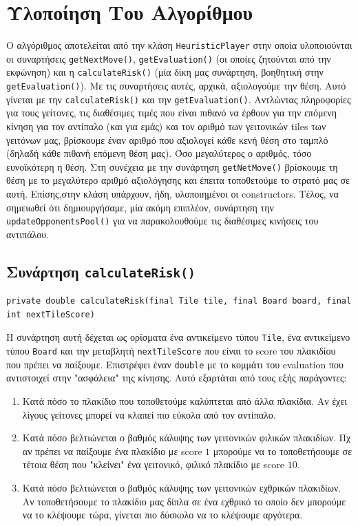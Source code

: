 \chapter{Υλοποίηση Του Αλγορίθμου}
\begin{sloppypar}
Ο αλγόριθμος αποτελείται από την κλάση \lstinline!HeuristicPlayer! στην οποία υλοποιούνται οι
συναρτήσεις  \lstinline!getNextMove()!,
\lstinline!getEvaluation()! (οι οποίες ζητούνται από την εκφώνηση) και η
\lstinline!calculateRisk()! (μία δίκη μας συνάρτηση, βοηθητική στην \lstinline!getEvaluation()!).
Με τις συναρτήσεις αυτές, αρχικά, αξιολογούμε την θέση.
Αυτό γίνεται με την \lstinline!calculateRisk()! και την
\lstinline!getEvaluation()!.
Αντλώντας πληροφορίες για τους γείτονες, τις διαθέσιμες τιμές που είναι
πιθανό να έρθουν για την επόμενη κίνηση  για τον αντίπαλο (και για εμάς) και τον αριθμό
των γειτονικών tiles των γειτόνων μας,
βρίσκουμε έναν αριθμό που αξιολογεί κάθε κενή θέση στο ταμπλό
(δηλαδή κάθε πιθανή επόμενη θέση μας).
Όσο μεγαλύτερος ο αριθμός, τόσο ευνοϊκότερη η θέση.
Στη συνέχεια με την συνάρτηση \lstinline!getNetMove()! βρίσκουμε τη
θέση με το μεγαλύτερο αριθμό αξιολόγησης και έπειτα τοποθετούμε το στρατό μας σε αυτή.
Επίσης,στην κλάση υπάρχουν, ήδη, υλοποιημένοι οι constructors.
Τέλος, να σημειωθεί ότι δημιουργήσαμε, μία ακόμη επιπλέον, συνάρτηση την \lstinline!updateOpponentsPool()! για να
παρακολουθούμε τις διαθέσιμες κινήσεις του αντιπάλου.
\end{sloppypar}

\section{Συνάρτηση \texttt{calculateRisk()}} \label{sec:calculateRisk}
\begin{lstlisting}[numbers=none, breaklines=true, title={Declaration της συνάρτησης}]
private double calculateRisk(final Tile tile, final Board board, final int nextTileScore)
\end{lstlisting}
Η συνάρτηση αυτή δέχεται ως ορίσματα ένα αντικείμενο τύπου \lstinline!Tile!,
ένα αντικείμενο τύπου \lstinline!Board! και
την μεταβλητή \lstinline!nextTileScore! που είναι το score του πλακιδίου που πρέπει να παίξουμε.
Επιστρέφει έναν \lstinline!double! με το κομμάτι του evaluation που αντιστοιχεί στην "ασφάλεια" της κίνησης.
Αυτό εξαρτάται από τους εξής παράγοντες:
\begin{enumerate}
\item Κατά πόσο το πλακίδιο που τοποθετούμε καλύπτεται από άλλα πλακίδια.
Αν έχει λίγους γείτονες μπορεί να κλαπεί πιο εύκολα από τον αντίπαλο.
\item Κατά πόσο βελτιώνεται ο βαθμός κάλυψης των γειτονικών φιλικών πλακιδίων.
Πχ αν πρέπει να παίξουμε ένα πλακίδιο με score $1$ μπορούμε να το τοποθετήσουμε σε τέτοια θέση που "κλείνει" ένα γειτονικό, φιλικό πλακίδιο με score $10$.
\item Κατά πόσο βελτιώνεται ο βαθμός κάλυψης των γειτονικών εχθρικών πλακιδίων.
Αν τοποθετήσουμε το πλακίδιο μας δίπλα σε ένα εχθρικό το οποίο δεν μπορούμε να το κλέψουμε τώρα, γίνεται πιο δύσκολο να το κλέψουμε αργότερα.
\end{enumerate}

